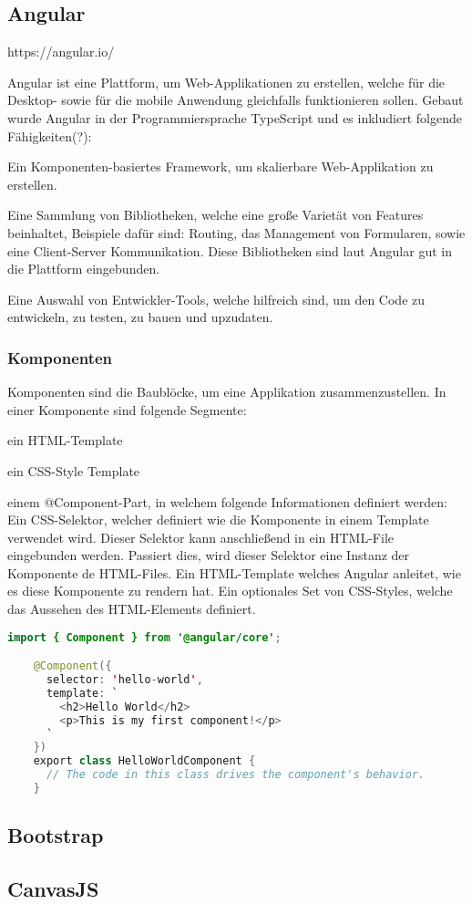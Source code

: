 \subsection{Angular}
https://angular.io/ 

Angular ist eine Plattform, um Web-Applikationen zu erstellen, welche für die Desktop- sowie für die mobile Anwendung gleichfalls funktionieren sollen. Gebaut wurde Angular in der Programmiersprache TypeScript und es inkludiert folgende Fähigkeiten(?):

\begin{compactitem}
    \item Ein Komponenten-basiertes Framework, um skalierbare Web-Applikation zu erstellen.
    \item Eine Sammlung von Bibliotheken, welche eine große Varietät von Features beinhaltet, Beispiele dafür sind: Routing, das Management von Formularen, sowie eine Client-Server Kommunikation. Diese Bibliotheken sind laut Angular gut in die Plattform eingebunden.       
    \item Eine Auswahl von Entwickler-Tools, welche hilfreich sind, um den Code zu entwickeln, zu testen, zu bauen und upzudaten.
\end{compactitem}

\subsubsection{Komponenten}
Komponenten sind die Baublöcke, um eine Applikation zusammenzustellen. In einer Komponente sind folgende Segmente: 

\begin{compactitem}
    \item ein HTML-Template
    \item ein CSS-Style Template      
    \item einem @Component-Part, in welchem folgende Informationen definiert werden:
    \subitem Ein CSS-Selektor, welcher definiert wie die Komponente in einem Template verwendet wird. Dieser Selektor kann anschließend in ein HTML-File eingebunden werden. Passiert dies, wird dieser Selektor eine Instanz der Komponente de HTML-Files.
    \subitem Ein HTML-Template welches Angular anleitet, wie es diese Komponente zu rendern hat.
    \subitem Ein optionales Set von CSS-Styles, welche das Aussehen des HTML-Elements definiert.
\end{compactitem}

\begin{lstlisting}[language=java,caption=Beipsiel für eine minimierte Angular Komponente,label=lst:impl:foo]
    import { Component } from '@angular/core';

    @Component({
      selector: 'hello-world',
      template: `
        <h2>Hello World</h2>
        <p>This is my first component!</p>
      `
    })
    export class HelloWorldComponent {
      // The code in this class drives the component's behavior.
    }
\end{lstlisting}

\subsection{Bootstrap}

\subsection{CanvasJS}
